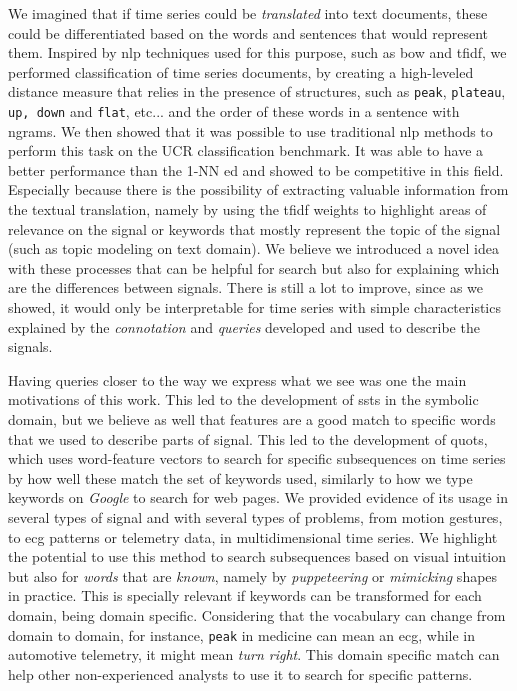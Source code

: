 We imagined that if time series could be \textit{translated} into text documents, these could be differentiated based on the words and sentences that would represent them. Inspired by \gls{nlp} techniques used for this purpose, such as \gls{bow} and \gls{tfidf}, we performed classification of time series documents, by creating a high-leveled distance measure that relies in the presence of structures, such as \texttt{peak}, \texttt{plateau}, \texttt{up, down} and \texttt{flat}, etc... and the order of these words in a sentence with ngrams. We then showed that it was possible to use traditional \gls{nlp} methods to perform this task on the UCR classification benchmark. It was able to have a better performance than the 1-NN \gls{ed} and showed to be competitive in this field. Especially because there is the possibility of extracting valuable information from the textual translation, namely by using the \gls{tfidf} weights to highlight areas of relevance on the signal or keywords that mostly represent the topic of the signal (such as topic modeling on text domain). We believe we introduced a novel idea with these processes that can be helpful for search but also for explaining which are the differences between signals. There is still a lot to improve, since as we showed, it would only be interpretable for time series with simple characteristics explained by the \textit{connotation} and \textit{queries} developed and used to describe the signals.
\par
Having queries closer to the way we express what we see was one the main motivations of this work. This led to the development of \gls{ssts} in the symbolic domain, but we believe as well that features are a good match to specific words that we used to describe parts of signal. This led to the development of \gls{quots}, which uses word-feature vectors to search for specific subsequences on time series by how well these match the set of keywords used, similarly to how we type keywords on \textit{Google} to search for web pages. We provided evidence of its usage in several types of signal and with several types of problems, from motion gestures, to \gls{ecg} patterns or telemetry data, in multidimensional time series. We highlight the potential to use this method to search subsequences based on visual intuition but also for \textit{words} that are \textit{known}, namely by \textit{puppeteering} or \textit{mimicking} shapes in practice. This is specially relevant if keywords can be transformed for each domain, being domain specific. Considering that the vocabulary can change from domain to domain, for instance, \texttt{peak} in medicine can mean an \gls{ecg}, while in automotive telemetry, it might mean \textit{turn right}. This domain specific match can help other non-experienced analysts to use it to search for specific patterns.


